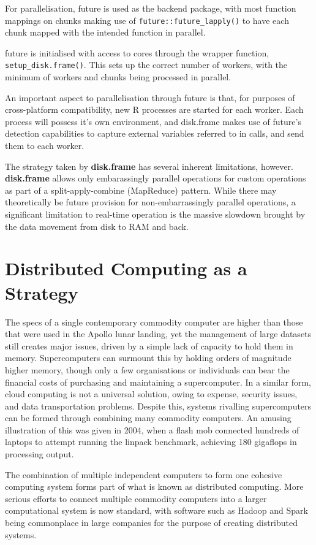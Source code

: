 For parallelisation, future is used as the backend package, with most function mappings on chunks making use of \texttt{future::future\_lapply()} to have each chunk mapped with the intended function in parallel. 

future is initialised with access to cores through the wrapper function, \texttt{setup\_disk.frame()}\cite{zj19:_key}. 
This sets up the correct number of workers, with the minimum of workers and chunks being processed in parallel.

An important aspect to parallelisation through future is that, for purposes of cross-platform compatibility, new R processes are started for each worker\cite{zj19:_using}. 
Each process will possess it's own environment, and disk.frame makes use of future's detection capabilities to capture external variables referred to in calls, and send them to each worker.

The strategy taken by \textbf{disk.frame} has several inherent limitations, however.
\textbf{disk.frame} allows only embarassingly parallel operations for custom operations as part of a split-apply-combine (MapReduce) pattern. 
While there may theoretically be future provision for non-embarrassingly parallel operations, a significant limitation to real-time operation is the massive slowdown brought by the data movement from disk to RAM and back.

\section{Distributed Computing as a Strategy}
\label{dist}
The specs of a single contemporary commodity computer are higher than those that were used in the Apollo lunar landing, yet the management of large datasets still creates major issues, driven by a simple lack of  capacity to hold them in memory.
Supercomputers can surmount this by holding orders of magnitude higher memory, though only a few organisations or individuals can bear the financial costs of purchasing and maintaining a supercomputer. 
In a similar form, cloud computing is not a universal solution, owing to expense, security issues, and data transportation problems.
Despite this, systems rivalling supercomputers can be formed through combining many commodity computers.
An amusing illustration of this was given in 2004, when a flash mob connected hundreds of laptops to attempt running the linpack benchmark, achieving 180 gigaflops in processing output\cite{perry2004flashcomp}.

The combination of multiple independent computers to form one cohesive computing system forms part of what is known as distributed computing.
More serious efforts to connect multiple commodity computers into a larger computational system is now standard, with software such as Hadoop and Spark being commonplace in large companies for the purpose of creating distributed systems.

